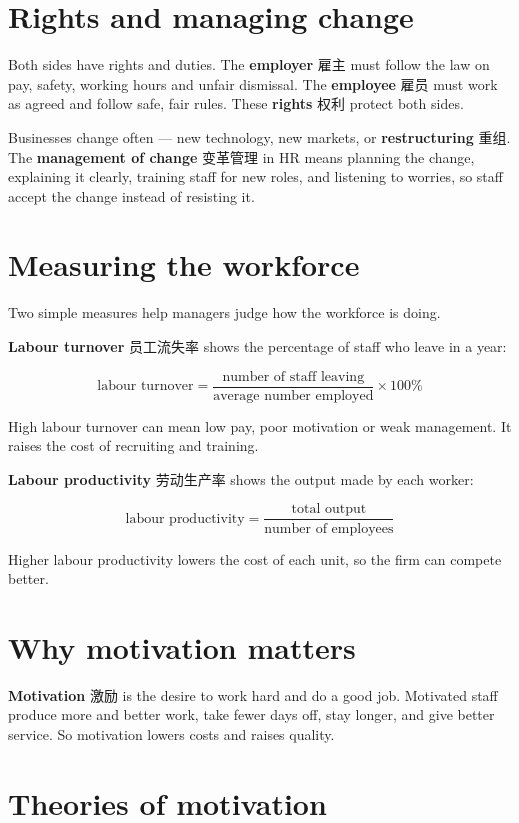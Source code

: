 \documentclass[11pt]{article}
\begin{document}
\section*{Rights and managing change}

Both sides have rights and duties. The \textbf{employer} 雇主 must follow the law on pay, safety, working hours and unfair dismissal. The \textbf{employee} 雇员 must work as agreed and follow safe, fair rules. These \textbf{rights} 权利 protect both sides.

Businesses change often — new technology, new markets, or \textbf{restructuring} 重组. The \textbf{management of change} 变革管理 in HR means planning the change, explaining it clearly, training staff for new roles, and listening to worries, so staff accept the change instead of resisting it.

\section*{Measuring the workforce}

Two simple measures help managers judge how the workforce is doing.

\textbf{Labour turnover} 员工流失率 shows the percentage of staff who leave in a year:

\[
\text{labour turnover} = \frac{\text{number of staff leaving}}{\text{average number employed}} \times 100\%
\]

High labour turnover can mean low pay, poor motivation or weak management. It raises the cost of recruiting and training.

\textbf{Labour productivity} 劳动生产率 shows the output made by each worker:

\[
\text{labour productivity} = \frac{\text{total output}}{\text{number of employees}}
\]

Higher labour productivity lowers the cost of each unit, so the firm can compete better.

\section*{Why motivation matters}

\textbf{Motivation} 激励 is the desire to work hard and do a good job. Motivated staff produce more and better work, take fewer days off, stay longer, and give better service. So motivation lowers costs and raises quality.

\section*{Theories of motivation}
\end{document}
